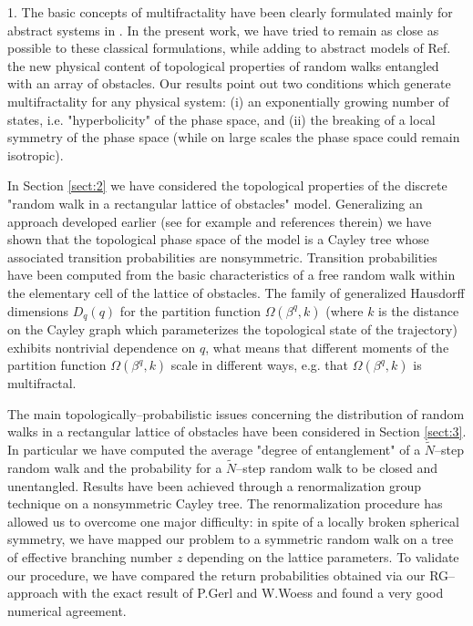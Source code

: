 1. The basic concepts of multifractality have been clearly formulated mainly
for abstract systems in \cite{procacc}. In the present work, we have tried to remain
as close as possible to these classical formulations, while adding to  abstract
models of Ref.\cite{procacc}  the new physical content of topological  properties of random walks entangled with an array of obstacles. Our results point out two conditions which generate multifractality for any  physical system: (i) an exponentially growing number of  states, i.e.
"hyperbolicity" of the phase space, and (ii) the breaking of a  local symmetry of
the phase space (while on large scales the phase space could remain isotropic). 

In Section \ref{sect:2} we have considered the topological properties of 
the discrete  "random walk in a  rectangular lattice of  obstacles" model.
Generalizing an approach developed earlier (see for example \cite{nechaev} and
references  therein) we have shown that  the topological phase space of the model is a Cayley tree whose associated transition probabilities are nonsymmetric. Transition probabilities have been computed from the  basic characteristics of a free random walk within the elementary cell of the lattice of obstacles. The family of generalized Hausdorff dimensions
$D_q(q)$ for the partition function $\Omega(\beta^q,k)$ (where $k$ is the
distance on the Cayley graph which  parameterizes the topological state of the
trajectory) exhibits nontrivial dependence on $q$, what means that different moments of
the partition function $\Omega(\beta^q,k)$ scale in different ways, e.g.  that $\Omega(\beta^q,k)$ is multifractal.

The main topologically--probabilistic issues concerning the distribution of
 random walks in a rectangular lattice of obstacles have been considered
in  Section \ref{sect:3}. In particular we have computed the average "degree of
entanglement" of a $\tilde{N}$--step random walk and the probability for a $\tilde{N}$--step random
walk to be closed and unentangled. Results have been achieved through a renormalization group technique 
on a nonsymmetric Cayley tree. The renormalization procedure has allowed us to
overcome one major  difficulty: in spite of  a locally broken spherical symmetry, we have mapped our problem to a symmetric random walk on a tree of effective branching number $z$ depending on the lattice parameters. To validate  our procedure, we have compared the return
probabilities obtained via our RG--approach with  the exact result of P.Gerl and
W.Woess \cite{woess} and found a very good numerical agreement.  

